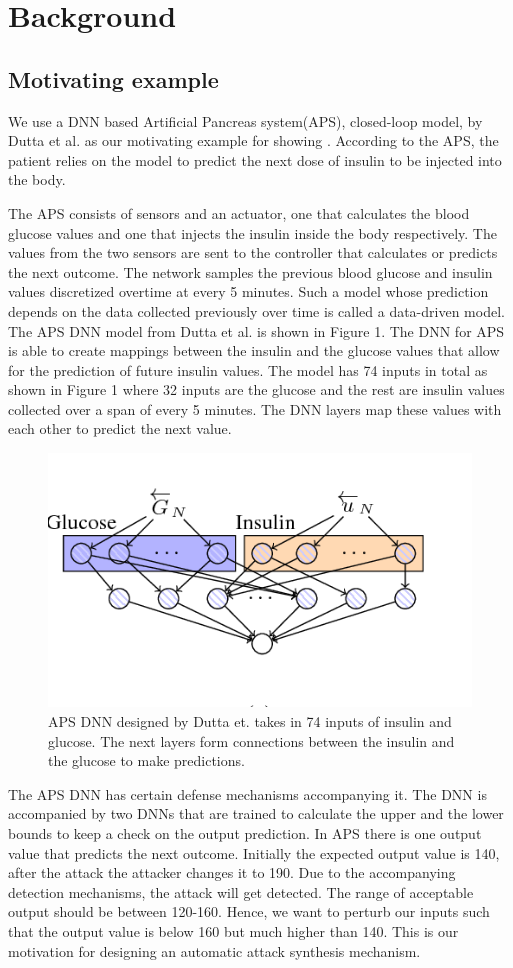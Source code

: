 \chapter{Background}
\label{ch:Chapter2}
\section{Motivating example}
We use a DNN based Artificial Pancreas system(APS), closed-loop model, by Dutta et al. \cite{10.1007/978-3-319-99429-1_11}  as our motivating example for showing \attack. According to the APS, the patient relies on the model to predict the next dose of insulin to be injected into the body. 

The APS consists of sensors and an actuator, one that calculates the blood glucose values and one that injects the insulin inside the body respectively. The values from the two sensors are sent to the controller that calculates or predicts the next outcome. The network samples the previous blood glucose and insulin values discretized overtime at every 5 minutes. Such a model whose prediction depends on the data collected previously over time is called a data-driven model. The APS DNN model from Dutta et al. is shown in Figure 1. The DNN for APS is able to create mappings between the insulin and the glucose values that allow for the prediction of future insulin values. The model has 74 inputs in total as shown in Figure 1 where 32 inputs are the glucose and the rest are insulin values collected over a span of every 5 minutes. The DNN layers map these values with each other to predict the next value. 
\begin{figure}
	\centering
	\includegraphics[width=0.7\linewidth, height=0.3\linewidth]{Images/APSDNN}
	\caption[APS DNN]{APS DNN designed by Dutta et. takes in 74 inputs of insulin and glucose. The next layers form connections between the insulin and the glucose to make predictions.}
	\label{fig:apsdnn}
\end{figure}

The APS DNN has certain defense mechanisms accompanying it. The DNN is accompanied by two DNNs that are trained to calculate the upper and the lower bounds to keep a check on the output prediction. In APS there is one output value that predicts the next outcome. Initially the expected output value is 140, after the attack the attacker changes it to 190. Due to the accompanying detection mechanisms, the attack will get detected. The range of acceptable output should be between 120-160. Hence, we want to perturb our inputs such that the output value is below 160 but much higher than 140. This is our motivation for designing an automatic attack synthesis mechanism. 

